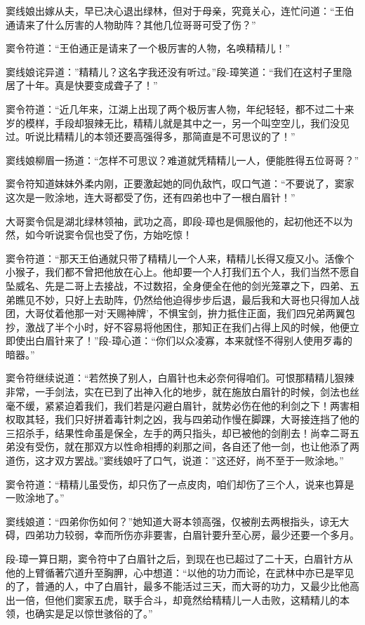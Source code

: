 \documentclass[12pt,oneside]{book}
\begin{document}
窦线娘出嫁从夫，早已决心退出绿林，但对于母亲，究竟关心，连忙问道：``王伯通请来了什么厉害的人物助阵？其他几位哥哥可受了伤？''

窦令符道：``王伯通正是请来了一个极厉害的人物，名唤精精儿！''

窦线娘诧异道：''精精儿？这名字我还没有听过。''段-璋笑道：``我们在这村子里隐居了十年。真是快要变成聋子了！''

窦令符道：``近几年来，江湖上出现了两个极厉害人物，年纪轻轻，都不过二十来岁的模样，手段却狠辣无比，精精儿就是其中之一，另一个叫空空儿，我们没见过。听说比精精儿的本领还要高强得多，那简直是不可思议的了！''

窦线娘柳眉一扬道：``怎样不可思议？难道就凭精精儿一人，便能胜得五位哥哥？''

窦令符知道妹妹外柔内刚，正要激起她的同仇敌忾，叹口气道：``不要说了，窦家这次是一败涂地，连大哥都受了伤，还有四弟也中了一根白眉针！''

大哥窦令侃是湖北绿林领袖，武功之高，即段-璋也是佩服他的，起初他还不以为然，如今听说窦令侃也受了伤，方始吃惊！

窦令符道：``那天王伯通就只带了精精儿一个人来，精精儿长得又瘦又小。活像个小猴子，我们都不曾把他放在心上。他却要一个人打我们五个人，我们当然不愿自坠威名、先是二哥上去接战，不过数招，全身便全在他的剑光笼罩之下，四弟、五弟瞧见不妙，只好上去助阵，仍然给他迫得步步后退，最后我和大哥也只得加人战团，大哥仗着他那一对`天赐神牌'，不惧宝剑，拚力抵住正面，我们四兄弟两翼包抄，激战了半个小时，好不容易将他困住，那知正在我们占得上风的时候，他便立即使出白眉针来了！''段-璋心道：``你们以众凌寡，本来就怪不得别人使用歹毒的暗器。''

窦令符继续说道：``若然换了别人，白眉针也未必奈何得咱们。可恨那精精儿狠辣非常，一手剑法，实在已到了出神入化的地步，就在施放白眉针的时候，剑法也丝毫不缓，紧紧迫着我们，我们若是闪避白眉针，就势必伤在他的利剑之下！两害相权取其轻，我们只好拼着毒针刺之凶，我与四弟动作慢在脚踝，大哥接连挡了他的三招杀手，结果性命虽是保全，左手的两只指头，却已被他的剑削去！尚幸二哥五弟没有受伤，就在那双方以性命相搏的刹那之间，各自还了他一剑，也让他添了两道伤，这才双方罢战。''窦线娘吁了口气，说道：''这还好，尚不至于一败涂地。''

窦令符道：``精精儿虽受伤，却只伤了一点皮肉，咱们却伤了三个人，说来也算是一败涂地了。''

窦线娘道：``四弟你伤如何？''她知道大哥本领高强，仅被削去两根指头，谅无大碍，四弟功力较弱，幸而所伤亦非要害，白眉针要升至心房，最少还要一个多月。

段-璋一算日期，窦令符中了白眉针之后，到现在也已超过了二十天，白眉针方从他的上臂循著穴道升至胸胛，心中想道：``以他的功力而论，在武林中亦已是罕见的了，普通的人，中了白眉针，最多不能活过三天，而大哥的功力，又最少比他高出一倍，但他们窦家五虎，联手合斗，却竟然给精精儿一人击败，这精精儿的本领，也确实是足以惊世骇俗的了。''
\end{document}
